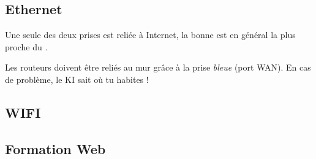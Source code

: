 \documentclass{ki020}
\begin{document}
\pagestyle{empty}


\subsection{Ethernet}

\Footer
\lipsum[1-2]

\begin{kiframe}
    Une seule des deux prises  est reliée à Internet, la bonne est en général la plus proche du .

    Les routeurs doivent être reliés au mur grâce à la prise \emph{bleue} (port WAN). En cas de problème, le KI sait où tu habites !
\end{kiframe}

\lipsum[1]

\subsection{WIFI}

\lipsum[1]


\subsection{Formation Web}

\Footer
\lipsum[1-3]
\end{document}

